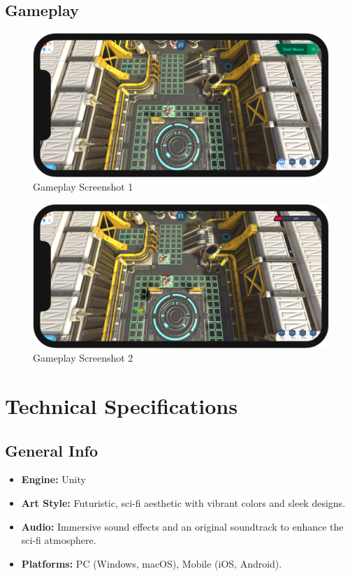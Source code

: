 \documentclass[12pt,a4paper]{report}
\begin{document}
\section{Gameplay} 

\begin{figure}[h!]
	\centering
	\includegraphics[scale=0.5]{images/Gameplay1.png}
	\caption{Gameplay Screenshot 1}
	\label{fig:Gameplay1}
\end{figure}

\begin{figure}[h!]
	\centering
	\includegraphics[scale=0.5]{images/Gameplay2.png}
	\caption{Gameplay Screenshot 2}
	\label{fig:Gameplay2}
\end{figure}




\chapter{Technical Specifications}
\section{General Info} 
\begin{itemize}
	\item \textbf{Engine:} Unity 
	\item \textbf{Art Style:} Futuristic, sci-fi aesthetic with vibrant colors and sleek designs.  
	\item \textbf{Audio:} Immersive sound effects and an original soundtrack to enhance the sci-fi atmosphere. 
	\item \textbf{Platforms:} PC (Windows, macOS), Mobile (iOS, Android). 
\end{itemize}
\end{document}
